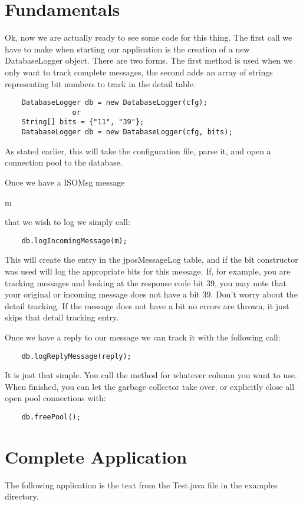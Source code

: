 \documentclass[11pt]{report}
\begin{document}
\begin{flushleft}
    \section{Fundamentals}
    Ok, now we are actually ready to see some code for this thing.  The first
    call we have to make when starting our application is the creation of a
    new DatabaseLogger object.  There are two forms.  The first method is used
    when we only want to track complete messages, the second adds an array of
    strings representing bit numbers to track in the detail table.
    \begin{verbatim}
    DatabaseLogger db = new DatabaseLogger(cfg);
                or
    String[] bits = {"11", "39"};
    DatabaseLogger db = new DatabaseLogger(cfg, bits);
    \end{verbatim}
    As stated earlier, this will take the configuration file, parse it, and
    open a connection pool to the database.

    Once we have a ISOMsg message \begin{slshape}m\end{slshape} that we wish 
    to log we simply call:
    \begin{verbatim}
    db.logIncomingMessage(m);
    \end{verbatim}
    This will create the entry in the jposMessageLog table, and if the bit
    constructor was used will log the appropriate bits for this message.  If,
    for example, you are tracking messages and looking at the response code
    bit 39, you may note that your original or incoming message does not have
    a bit 39. Don't worry about the detail tracking.  If the message does not
    have a bit no errors are thrown, it just skips that detail tracking entry.

    Once we have a reply to our message we can track it with the following
    call:
    \begin{verbatim}
    db.logReplyMessage(reply);
    \end{verbatim}
    It is just that simple.  You call the method for whatever column you want
    to use.  When finished, you can let the garbage collector take over, or
    explicitly close all open pool connections with:
    \begin{verbatim}
    db.freePool();
    \end{verbatim}

    \section{Complete Application}
    The following application is the text from the Test.java file in the
    examples directory.
    \begin{verbatim}


\end{verbatim}
\end{flushleft}
\end{document}
